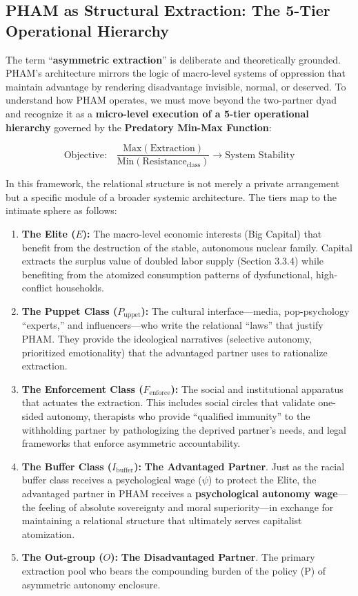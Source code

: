 \documentclass[12pt,openany]{book}
\numberwithin{equation}{chapter}
\begin{document}
\subsection{PHAM as Structural Extraction: The 5-Tier Operational Hierarchy}

The term ``\textbf{asymmetric extraction}'' is deliberate and theoretically grounded. PHAM's architecture mirrors the logic of macro-level systems of oppression that maintain advantage by rendering disadvantage invisible, normal, or deserved. To understand how PHAM operates, we must move beyond the two-partner dyad and recognize it as a \textbf{micro-level execution of a 5-tier operational hierarchy} governed by the \textbf{Predatory Min-Max Function}:

\[
\text{Objective:} \quad \frac{\text{Max}(\text{Extraction})}{\text{Min}(\text{Resistance}_{\text{class}})} \rightarrow \text{System Stability}
\]

In this framework, the relational structure is not merely a private arrangement but a specific module of a broader systemic architecture. The tiers map to the intimate sphere as follows:

\begin{enumerate}
    \item \textbf{The Elite ($E$):} The macro-level economic interests (Big Capital) that benefit from the destruction of the stable, autonomous nuclear family. Capital extracts the surplus value of doubled labor supply (Section 3.3.4) while benefiting from the atomized consumption patterns of dysfunctional, high-conflict households.
    
    \item \textbf{The Puppet Class ($P_{\text{uppet}}$):} The cultural interface---media, pop-psychology ``experts,'' and influencers---who write the relational ``laws'' that justify PHAM. They provide the ideological narratives (selective autonomy, prioritized emotionality) that the advantaged partner uses to rationalize extraction.
    
    \item \textbf{The Enforcement Class ($F_{\text{enforce}}$):} The social and institutional apparatus that actuates the extraction. This includes social circles that validate one-sided autonomy, therapists who provide ``qualified immunity'' to the withholding partner by pathologizing the deprived partner's needs, and legal frameworks that enforce asymmetric accountability.
    
    \item \textbf{The Buffer Class ($I_{\text{buffer}}$):} \textbf{The Advantaged Partner}. Just as the racial buffer class receives a psychological wage ($\psi$) to protect the Elite, the advantaged partner in PHAM receives a \textbf{psychological autonomy wage}---the feeling of absolute sovereignty and moral superiority---in exchange for maintaining a relational structure that ultimately serves capitalist atomization.
    
    \item \textbf{The Out-group ($O$):} \textbf{The Disadvantaged Partner}. The primary extraction pool who bears the compounding burden of the policy (P) of asymmetric autonomy enclosure.
\end{enumerate}
\end{document}
